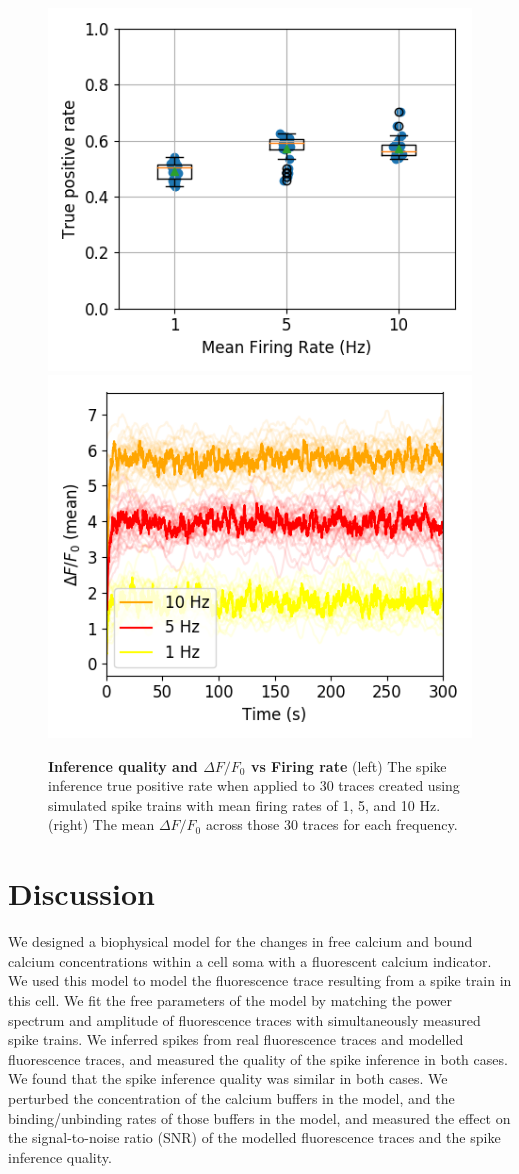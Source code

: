 \documentclass[a4paper,12pt]{article}
\theoremstyle{definition}
\begin{document}
\begin{figure}
  \includegraphics[width=0.5\linewidth]{figures/simulated_oasis_tp_paper.png}
  \includegraphics[width=0.5\linewidth]{figures/mean_fluorescence_comparison.png}
  \caption{\textbf{Inference quality and $\Delta F/F_0$ vs Firing rate} (left) The spike inference true positive rate when applied to 30 traces created using simulated spike trains with mean firing rates of 1, 5, and 10 Hz. (right) The mean $\Delta F/F_0$ across those 30 traces for each frequency.}
  \label{fig:frequency_comparison_measures}
\end{figure}

\section{Discussion}
We designed a biophysical model for the changes in free calcium and bound calcium concentrations within a cell soma with a fluorescent calcium indicator. We used this model to model the fluorescence trace resulting from a spike train in this cell.  We fit the free parameters of the model by matching the power spectrum and amplitude of fluorescence traces with simultaneously measured spike trains. We inferred spikes from real fluorescence traces and modelled fluorescence traces, and measured the quality of the spike inference in both cases. We found that the spike inference quality was similar in both cases. We perturbed the concentration of the calcium buffers in the model, and the binding/unbinding rates of those buffers in the model, and measured the effect on the signal-to-noise ratio (SNR) of the modelled fluorescence traces and the spike inference quality. 
\end{document}
